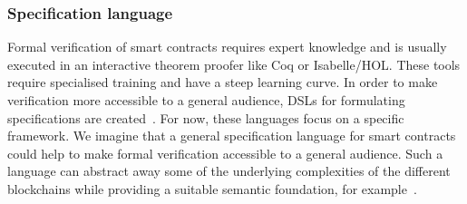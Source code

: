 \subsubsection{Specification language}
Formal verification of smart contracts requires expert knowledge and is usually executed in an interactive theorem proofer like Coq or Isabelle/HOL.
These tools require specialised training and have a steep learning curve.
In order to make verification more accessible to a general audience, DSLs for formulating specifications are created~\cite{He2018,Erfurt2018,RuntimeVerification2018}.
For now, these languages focus on a specific framework.
We imagine that a general specification language for smart contracts could help to make formal verification accessible to a general audience.
Such a language can abstract away some of the underlying complexities of the different blockchains while providing a suitable semantic foundation, for example~\cite{Sergey2018a,Sergey2017}.


